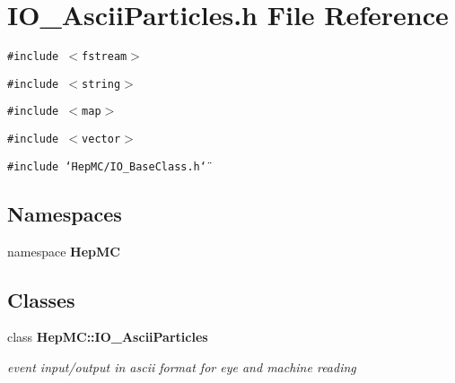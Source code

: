 \section{IO\_\-Ascii\-Particles.h File Reference}
\label{IO__AsciiParticles_8h}
{\tt \#include $<$fstream$>$}\par
{\tt \#include $<$string$>$}\par
{\tt \#include $<$map$>$}\par
{\tt \#include $<$vector$>$}\par
{\tt \#include \char`\"{}Hep\-MC/IO\_\-Base\-Class.h\char`\"{}}\par
\subsection*{Namespaces}
\begin{CompactItemize}
\item 
namespace {\bf Hep\-MC}
\end{CompactItemize}
\subsection*{Classes}
\begin{CompactItemize}
\item 
class {\bf Hep\-MC::IO\_\-Ascii\-Particles}
\begin{CompactList}\small\item\em event input/output in ascii format for eye and machine reading \item\end{CompactList}\end{CompactItemize}
